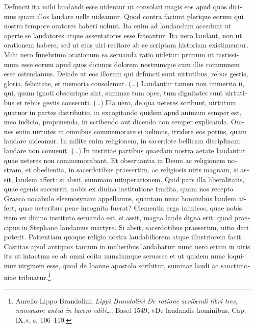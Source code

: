 \documentclass[a5paper,twoside]{article}
\renewenvironment{quote}
               {\list{}{\rightmargin 0mm
                \leftmargin 7mm
                \itemindent 0em}%
                \item\relax}
               {\endlist}
\begin{document}
\begin{quote}
\begin{latin}
Defuncti ita mihi laudandi esse uidentur ut consolari magis eos apud quos dicimus quam illos laudare uelle uideamur. Quod contra faciunt plerique eorum qui nostro tempore oratores haberi uolunt. Ita enim ad laudandum accedunt ut aperte se laudatores atque assentatores esse fateantur. Ita uero laudant, non ut orationem habere, sed ut eius uiri recitare ab se scriptam historiam existimentur. Mihi uero funebrium orationum ea seruanda ratio uidetur: primum ut iustissimum esse eorum apud quos dicimus dolorem nostrumque cum illis communem esse ostendamus. Deinde ut eos illorum qui defuncti sunt uirtutibus, rebus gestis, gloria, felicitate, et memoria consolemur. (\dots) Laudantur tamen non immerito ii, qui, quum ignoti obscurique sint, summas tum opes, tum dignitates sunt uirtutibus et rebus gestis consecuti. (\dots) Illa uero, de qua ueteres scribunt, uirtutum quatuor in partes distributio, in excogitando quidem apud animum semper est, meo iudicio, proponenda, in scribendo aut dicendo non semper explicanda. Omnes enim uirtutes in omnibus commemorare si uelimus, irridere eos potius, quam laudare uideamur. In milite enim religionem, in sacerdote bellicam disciplinam laudare non conuenit. (\dots) In iustitiae partibus quaedam nostra aetate laudantur quae ueteres non commemorabant. Et obseruantia in Deum ac religionem nostram, et obedientia, in sacerdotibus praesertim, ac religiosis uiris magnam, si assit, laudem affert: si absit, summam uituperationem. Quid pars illa liberalitatis, quae egenis succurrit, nobis ex diuina institutione tradita, quam nos recepto Graeco uocabulo eleemosynam appellamus, quantam nunc hominibus laudem affert, quae ueteribus pene incognita fuerat? Clementia erga inimicos, quae nobis item ex diuino instituto seruanda est, si assit, magna laude digna erit: quod praecipue in Stephano laudamus martyre. Si absit, sacerdotibus praesertim, uitio dari poterit. Patientiam quoque religio nostra laudabiliorem atque illustriorem facit. Castitas apud antiquos tantum in mulieribus laudabatur: nunc uero etiam in uiris ita ut intactum se ab omni coitu mundumque seruasse et ut quidem nunc loquimur uirginem esse, quod de Ioanne apostolo scribitur, summae laudi ac sanctimoniae tribuatur.\footnote{Aurelio Lippo Brandolini, \textit{Lippi Brandolini De ratione scribendi libri tres, numquam antea in lucem editi\dots}, Basel 1549, »De laudandis hominibus. Cap. IX.«, s. 106–110.}
\end{latin}


\end{quote}
\end{document}
